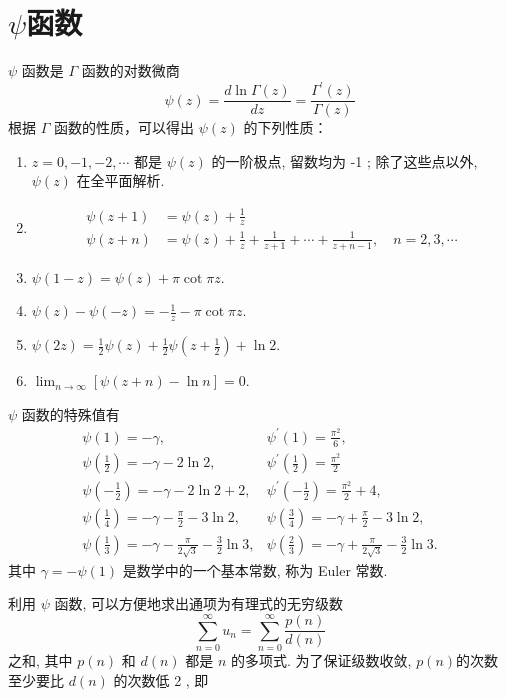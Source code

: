 \section{$\psi$函数}
$\psi$ 函数是 $\Gamma$ 函数的对数微商
\begin{equation}
    \psi(z)=\frac{d \ln \Gamma(z)}{d z}=\frac{\Gamma^{\prime}(z)}{\Gamma(z)}
\end{equation}
根据 $\Gamma$ 函数的性质，可以得出 $\psi(z)$ 的下列性质：

\begin{enumerate}
    \item $z=0,-1,-2, \cdots$ 都是 $\psi(z)$ 的一阶极点, 留数均为 -1 ; 除了这些点以外, $\psi(z)$ 在全平面解析.
    \item $$
    \begin{aligned}
    \psi(z+1) & =\psi(z)+\frac{1}{z} \\
    \psi(z+n) & =\psi(z)+\frac{1}{z}+\frac{1}{z+1}+\cdots+\frac{1}{z+n-1}, \quad n=2,3, \cdots
    \end{aligned}
    $$
    \item   $\psi(1-z)=\psi(z)+\pi \cot \pi z$.
    \item  $\psi(z)-\psi(-z)=-\frac{1}{z}-\pi \cot \pi z$.
    \item  $\psi(2 z)=\frac{1}{2} \psi(z)+\frac{1}{2} \psi\left(z+\frac{1}{2}\right)+\ln 2$.
    \item  $\lim _{n \rightarrow \infty}[\psi(z+n)-\ln n]=0$.
\end{enumerate}

$\psi$ 函数的特殊值有
$$
\begin{array}{ll}
\psi(1)=-\gamma, & \psi^{\prime}(1)=\frac{\pi^{2}}{6}, \\
\psi\left(\frac{1}{2}\right)=-\gamma-2 \ln 2, & \psi^{\prime}\left(\frac{1}{2}\right)=\frac{\pi^{2}}{2} \\
\psi\left(-\frac{1}{2}\right)=-\gamma-2 \ln 2+2, & \psi^{\prime}\left(-\frac{1}{2}\right)=\frac{\pi^{2}}{2}+4, \\
\psi\left(\frac{1}{4}\right)=-\gamma-\frac{\pi}{2}-3 \ln 2, & \psi\left(\frac{3}{4}\right)=-\gamma+\frac{\pi}{2}-3 \ln 2, \\
\psi\left(\frac{1}{3}\right)=-\gamma-\frac{\pi}{2 \sqrt{3}}-\frac{3}{2} \ln 3, & \psi\left(\frac{2}{3}\right)=-\gamma+\frac{\pi}{2 \sqrt{3}}-\frac{3}{2} \ln 3 .
\end{array}
$$
其中 $\gamma=-\psi(1)$ 是数学中的一个基本常数, 称为 Euler 常数.


利用 $\psi$ 函数, 可以方便地求出通项为有理式的无穷级数
$$
\sum_{n=0}^{\infty} u_{n}=\sum_{n=0}^{\infty} \frac{p(n)}{d(n)}
$$
之和, 其中 $p(n)$ 和 $d(n)$ 都是 $n$ 的多项式. 为了保证级数收敛, $p(n)$的次数至少要比 $d(n)$ 的次数低 2 , 即

